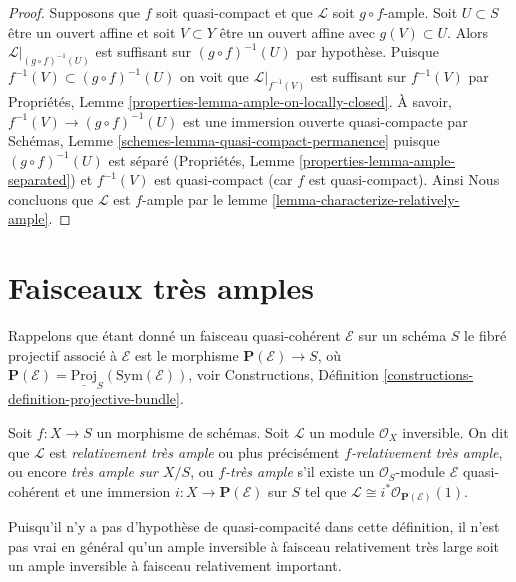 \begin{proof}
Supposons que $f$ soit quasi-compact et que $\mathcal{L}$
soit $g \circ f$-ample. Soit $U \subset S$
être un ouvert affine et soit
$V \subset Y$ être un ouvert affine avec
$g(V) \subset U$. Alors $\mathcal{L}|_{(g \circ f)^{-1}(U)}$
est suffisant sur $(g \circ f)^{-1}(U)$ par hypothèse.
Puisque $f^{-1}(V) \subset (g \circ f)^{-1}(U)$ on voit que $\mathcal{L}|_{f^{-1}(V)}$
est suffisant sur $f^{-1}(V)$ par Propriétés, Lemme
\ref{properties-lemma-ample-on-locally-closed}. À savoir, $f^{-1}(V) \to (g \circ f)^{-1}(U)$ est une immersion
ouverte quasi-compacte
par Schémas, Lemme \ref{schemes-lemma-quasi-compact-permanence} puisque
$(g \circ f)^{-1}(U)$ est séparé
(Propriétés, Lemme \ref{properties-lemma-ample-separated}) et $f^{-1}(V)$ est
quasi-compact (car $f$ est quasi-compact).
Ainsi Nous concluons que $\mathcal{L}$ est $f$-ample
par le lemme \ref{lemma-characterize-relatively-ample}.
\end{proof}







\section{Faisceaux très amples}
\label{section-very-ample}

\noindent
Rappelons que étant donné un faisceau quasi-cohérent
$\mathcal{E}$ sur un schéma $S$ le fibré projectif
{\it }
associé à $\mathcal{E}$ est le morphisme $\mathbf{P}(\mathcal{E}) \to S$, où
$\mathbf{P}(\mathcal{E}) = \underline{\text{Proj}}_S(\text{Sym}(\mathcal{E}))$,
voir Constructions, Définition \ref{constructions-definition-projective-bundle}.

\begin{definition}
\label{definition-very-ample}
Soit $f : X \to S$ un morphisme de schémas. Soit $\mathcal{L}$
un module $\mathcal{O}_X$ inversible. On dit que $\mathcal{L}$
est {\it relativement très ample} ou plus
précisément {\it $f$-relativement
très ample}, ou encore {\it
très ample sur $X/S$}, ou {\it
$f$-très ample} s'il existe un $\mathcal{O}_S$-module
$\mathcal{E}$ quasi-cohérent
et une immersion $i : X \to \mathbf{P}(\mathcal{E})$ sur $S$ tel que $\mathcal{L} \cong i^*\mathcal{O}_{\mathbf{P}(\mathcal{E})}(1)$.
\end{definition}



\noindent
Puisqu'il n'y a pas d'hypothèse de quasi-compacité dans cette définition, il n'est pas vrai en général
qu'un ample inversible à faisceau relativement très large soit un ample inversible à faisceau
relativement important.

